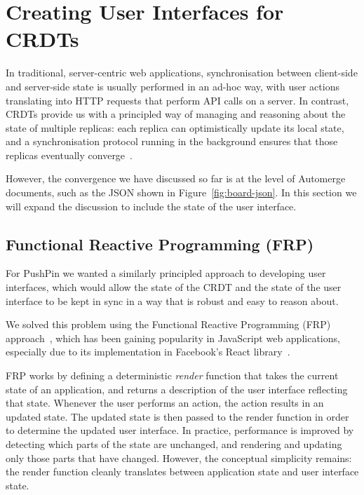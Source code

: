 \documentclass[sigplan,10pt]{acmart}
\begin{document}
\section{Creating User Interfaces for CRDTs}\label{sec:data-model-ui}

In traditional, server-centric web applications, synchronisation between client-side and server-side state is usually performed in an ad-hoc way, with user actions translating into HTTP requests that perform API calls on a server.
In contrast, CRDTs provide us with a principled way of managing and reasoning about the state of multiple replicas: each replica can optimistically update its local state, and a synchronisation protocol running in the background ensures that those replicas eventually converge~\cite{Saito:2005jw}.

However, the convergence we have discussed so far is at the level of Automerge documents, such as the JSON shown in Figure~\ref{fig:board-json}.
In this section we will expand the discussion to include the state of the user interface.

\subsection{Functional Reactive Programming (FRP)}

For PushPin we wanted a similarly principled approach to developing user interfaces, which would allow the state of the CRDT and the state of the user interface to be kept in sync in a way that is robust and easy to reason about.

We solved this problem using the Functional Reactive Programming (FRP) approach~\cite{Czaplicki:2013ig}, which has been gaining popularity in JavaScript web applications, especially due to its implementation in Facebook's React library~\cite{React}.

FRP works by defining a deterministic \emph{render} function that takes the current state of an application, and returns a description of the user interface reflecting that state.
Whenever the user performs an action, the action results in an updated state.
The updated state is then passed to the render function in order to determine the updated user interface.
In practice, performance is improved by detecting which parts of the state are unchanged, and rendering and updating only those parts that have changed.
However, the conceptual simplicity remains: the render function cleanly translates between application state and user interface state.
\end{document}
